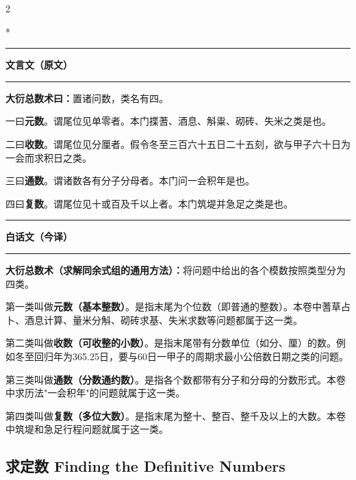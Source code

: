 \documentclass[11pt,a4paper]{article}
\newcommand{\zhtext}[1]{{\chinese #1}}
\newcommand{\leftcolheader}{%
  \noindent\textcolor{leftheader}{\rule{\columnwidth}{1.5pt}}\par
  \vspace{2pt}
  \noindent\textbf{\color{leftheader}\chinese 文言文（原文）}\par
  \vspace{2pt}
  \noindent\textcolor{leftheader}{\rule{\columnwidth}{0.6pt}}\par
  \vspace{4pt}
}
\newcommand{\rightcolheader}{%
  \noindent\textcolor{rightheader}{\rule{\columnwidth}{1.5pt}}\par
  \vspace{2pt}
  \noindent\textbf{\color{rightheader}\chinese 白话文（今译）}\par
  \vspace{2pt}
  \noindent\textcolor{rightheader}{\rule{\columnwidth}{0.6pt}}\par
  \vspace{4pt}
}
\begin{document}
\begin{paracol}{2}

\switchcolumn[0]*\leftcolheader

\small
\textbf{大衍总数术曰：}置诸问数，类名有四。

一曰\textbf{元数}。谓尾位见单零者。本门揲蓍、酒息、斛粜、砌砖、失米之类是也。

二曰\textbf{收数}。谓尾位见分厘者。假令冬至三百六十五日二十五刻，欲与甲子六十日为一会而求积日之类。

三曰\textbf{通数}。谓诸数各有分子分母者。本门问一会积年是也。

四曰\textbf{复数}。谓尾位见十或百及千以上者。本门筑堤并急足之类是也。

\switchcolumn\rightcolheader

\small\color{prefacecolor}
\textbf{大衍总数术（求解同余式组的通用方法）：}将问题中给出的各个模数按照类型分为四类。

第一类叫做\textbf{元数（基本整数）}。是指末尾为个位数（即普通的整数）。本卷中蓍草占卜、酒息计算、量米分斛、砌砖求基、失米求数等问题都属于这一类。

第二类叫做\textbf{收数（可收整的小数）}。是指末尾带有分数单位（如分、厘）的数。例如冬至回归年为365.25日，要与60日一甲子的周期求最小公倍数日期之类的问题。

第三类叫做\textbf{通数（分数通约数）}。是指各个数都带有分子和分母的分数形式。本卷中求历法"一会积年"的问题就属于这一类。

第四类叫做\textbf{复数（多位大数）}。是指末尾为整十、整百、整千及以上的大数。本卷中筑堤和急足行程问题就属于这一类。

\end{paracol}

\subsection{\zhtext{求定数} Finding the Definitive Numbers}
\end{document}
